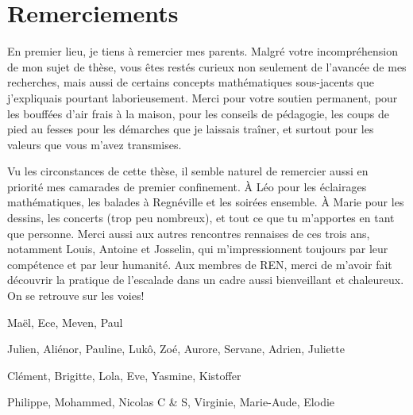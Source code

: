 \chapter*{Remerciements}


En premier lieu, je tiens à remercier mes parents. Malgré votre incompréhension de mon sujet de thèse, vous êtes restés curieux non seulement de l'avancée de mes recherches, mais aussi de certains concepts mathématiques sous-jacents que j'expliquais pourtant laborieusement. Merci pour votre soutien permanent, pour les bouffées d'air frais à la maison, pour les conseils de pédagogie, les coups de pied au fesses pour les démarches que je laissais traîner, et surtout pour les valeurs que vous m'avez transmises.

Vu les circonstances de cette thèse, il semble naturel de remercier aussi en priorité mes camarades de premier confinement. À Léo pour les éclairages mathématiques, les balades à Regnéville et les soirées ensemble. À Marie pour les dessins, les concerts (trop peu nombreux), et tout ce que tu m'apportes en tant que personne. Merci aussi aux autres rencontres rennaises de ces trois ans, notamment Louis, Antoine et Josselin, qui m'impressionnent toujours par leur compétence et par leur humanité. Aux membres de REN, merci de m'avoir fait découvrir la pratique de l'escalade dans un cadre aussi bienveillant et chaleureux. On se retrouve sur les voies!


\bigskip

Maël, Ece, Meven, Paul

Julien, Aliénor, Pauline, Lukô, Zoé, Aurore, Servane, Adrien, Juliette

Clément, Brigitte, Lola, Eve, Yasmine, Kistoffer

Philippe, Mohammed, Nicolas C \& S, Virginie, Marie-Aude, Elodie 